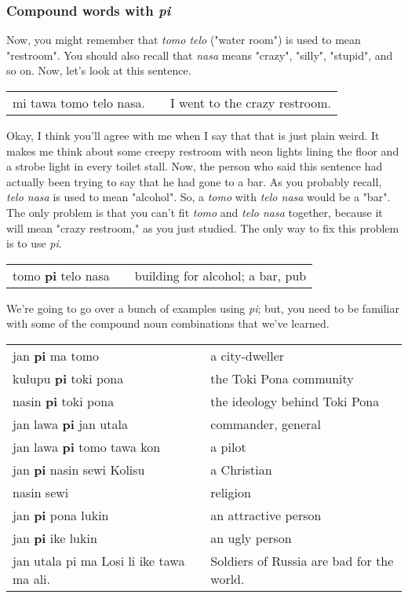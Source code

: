 \subsubsection*{Compound words with \textit{pi}} 
%
Now, you might remember that \textit{tomo telo} ("water room") is used to mean "restroom". 
You should also recall that \textit{nasa} means "crazy", "silly", "stupid", and so on. 
Now, let's look at this sentence.

\begin{supertabular}{p{5,5cm}|ll}
mi tawa tomo telo nasa. && I went to the crazy restroom. \\ %
\end{supertabular}  

Okay, I think you'll agree with me when I say that that is just plain weird. 
It makes me think about some creepy restroom with neon lights lining the floor and a strobe light in every toilet stall. 
Now, the person who said this sentence had actually been trying to say that he had gone to a bar. 
As you probably recall, \textit{telo nasa} is used to mean "alcohol". 
So, a \textit{tomo} with \textit{telo nasa} would be a "bar". 
The only problem is that you can't fit \textit{tomo} and \textit{telo nasa} together, because it will mean "crazy restroom," as you just studied. 
The only way to fix this problem is to use \textit{pi}.

\begin{supertabular}{p{5,5cm}|ll}
tomo \textbf{pi} telo nasa && building for alcohol; a bar, pub \\
\end{supertabular}  

We're going to go over a bunch of examples using \textit{pi}; but, you need to be familiar with some of the compound noun combinations that we've learned. 

\begin{supertabular}{p{5,5cm}|ll}
jan \textbf{pi} ma tomo && a city-dweller \\
kulupu \textbf{pi} toki pona && the Toki Pona community \\
nasin \textbf{pi} toki pona && the ideology behind Toki Pona \\
jan lawa \textbf{pi} jan utala && commander, general \\
jan lawa \textbf{pi} tomo tawa kon && a pilot \\
jan \textbf{pi} nasin sewi Kolisu && a Christian \\
nasin sewi && religion \\
jan \textbf{pi} pona lukin && an attractive person \\
jan \textbf{pi} ike lukin && an ugly person \\
jan utala pi ma Losi li ike tawa ma ali. && Soldiers of Russia are bad for the world. \\
\end{supertabular}  
%
